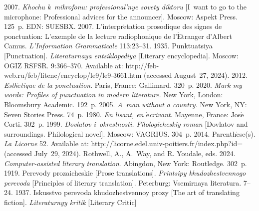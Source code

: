 \begin{multicols}{2}
\renewcommand{\bibname}{\protect\rmfamily References}



{\small\frenchspacing
{ %
\begin{thebibliography}{99}
 2007. \textit{Khochu k~mikrofonu: professional'nye sovety 
diktoru} [I~want to go to the microphone: Professional advices for the announcer]. 
Moscow: Aspekt Press. 125~p. EDN: SUESBX.
 2007. L'interpr$\acute{\mbox{e}}$tation prosodique des 
signes de ponctuation: L'exemple de la lecture radiophonique de 
l'$\acute{\mbox{E}}$tranger d'Albert Camus. \textit{L'Information 
Grammaticale} 113:23--31.
 1935. Punktuatsiya [Punctuation]. \textit{Literaturnaya 
entsiklopediya} [Literary encyclopedia]. Moscow: OGIZ RSFSR. 9:366--370.
Available at: {\sf http://feb-web.ru/feb/litenc/encyclop/le9/le9-3661.htm}
(accessed August~27, 2024).
 2012. 
\textit{Esth$\acute{\mbox{e}}$tique de la ponctuation}. Paris, France: 
Gallimard. 320~p.
 2020. \textit{Mark my words: Profiles of punctuation in 
modern literature}. New York,  London: Bloomsbury Academic. 192~p.
 2005. \textit{A~man without a country.} New York, NY: 
Seven Stories Press. 74~p.
 1980. \textit{En lisant, en $\acute{\mbox{e}}$crivant}. Mayenne, 
France: Jos$\acute{\mbox{e}}$ Corti. 302~p.
 1999. \textit{Dovlatov i~okrestnosti. Filologicheskiy roman} 
[Dovlatov and surroundings. Philological novel]. Moscow: VAGRIUS. 304~p.
 2014. Parenth$\grave{\mbox{e}}$se(s). \textit{La Licorne} 52. 
Available at: {\sf http://licorne.edel.univ-poitiers.fr/index.php?id=} (accessed 
July~29, 2024).
Rothwell, A., A.~Way, and R. Youdale, eds.  2024. \textit{Computer-assisted 
literary translation}. Abingdon, New York: Routledge. 302~p.
 1919. Perevody prozaicheskie [Prose translations]. 
\textit{Printsipy khudozhestvennogo perevoda} [Principles of literary 
translation].  Peterburg: Vsemirnaya li\-te\-ra\-tu\-ra. 7--24.
 1937. Iskusstvo perevoda khudozhestvennoy prozy [The art of 
translating fiction]. \textit{Literaturnyy kritik} [Literary Critic] 

\end{thebibliography}}}
\end{multicols}
